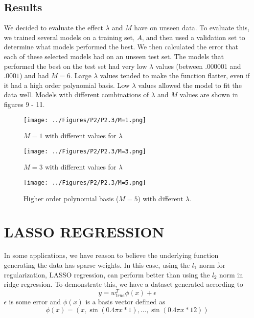 \documentclass[a4paper,twoside]{article}
\begin{document}
\subsection{Results}

We decided to evaluate the effect $\lambda$ and $M$ have on unseen data. To evaluate this, we trained several models on a training set, $A$, and then used a validation set to determine what models performed the best. We then calculated the error that each of these selected models had on an unseen test set. The models that performed the best on the test set had very low $\lambda$ values (between $.000001$ and $.0001$) and had $M = 6$. Large $\lambda$ values tended to make the function flatter, even if it had a high order polynomial basis. Low $\lambda$ values allowed the model to fit the data well. Models with different combinations of $\lambda$ and $M$ values are shown in figures 9 - 11. 


\begin{figure}[h]
  \texttt{[image: ../Figures/P2/P2.3/M=1.png]}
  \caption{$M=1$ with different values for $\lambda$}
  \label{fig:gradient_converging}
\end{figure}
\begin{figure}[h]
  \texttt{[image: ../Figures/P2/P2.3/M=3.png]}
  \caption{$M=3$ with different values for $\lambda$}
  \label{fig:gradient_converging}
\end{figure}
\begin{figure}[h]
  \texttt{[image: ../Figures/P2/P2.3/M=5.png]}
  \caption{Higher order polynomial basis ($M=5$) with different $\lambda$.}
  \label{fig:gradient_converging}
\end{figure}


\section{\uppercase{LASSO Regression}}
In some applications, we have reason to believe the underlying function generating the data has sparse weights. In this case, using the $l_1$ norm for regularization, LASSO regression, can perform better than using the $l_2$ norm in ridge regression. To demonstrate this, we have a dataset generated according to 
\begin{equation}
y = w_{true}^T \phi (x) + \epsilon
\end{equation}
$\epsilon$ is some error and $\phi (x)$ is a basis vector defined as 
\begin{equation}
\phi(x) = (x, \sin(0.4 \pi x * 1), ..., \sin(0.4 \pi x * 12))
\end{equation}
\end{document}
